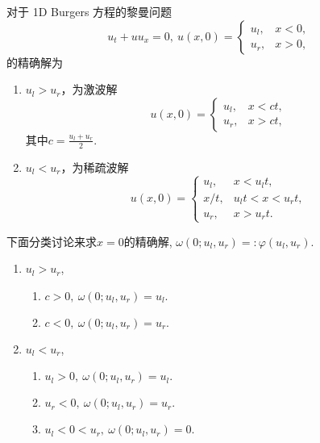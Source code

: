 \documentclass[12pt]{article}
\begin{document}
对于 1D Burgers 方程的黎曼问题
\begin{equation}
	u_{t}+uu_x=0,\ u\left(x, 0\right)=\left\{\begin{array}{ll}
		u_l, & x<0, \\
		u_r, & x>0,
	\end{array}\right.
\end{equation}
的精确解为
\begin{enumerate}
	\item $u_l>u_r$，为激波解
	      \begin{equation}
		      u\left(x, 0\right)=\left\{\begin{array}{ll}
			      u_l, & x<ct, \\
			      u_r, & x>ct,
		      \end{array}\right.
	      \end{equation}
	      其中$c=\frac{u_l+u_r}{2}$.
	\item $u_l<u_r$，为稀疏波解
	      \begin{equation}
		      u\left(x, 0\right)=\left\{\begin{array}{ll}
			      u_l, & x<u_lt,      \\
			      x/t, & u_lt<x<u_rt, \\
			      u_r, & x>u_rt.
		      \end{array}\right.
	      \end{equation}
\end{enumerate}

下面分类讨论来求$x=0$的精确解, $\omega\left(0;u_l,u_r\right)=:\varphi(u_l,u_r).$

\begin{enumerate}
	\item $u_l>u_r$,
	      \begin{enumerate}
		      \item $c>0,\ \omega\left(0;u_l,u_r\right)=u_l.$
		      \item $c<0,\ \omega\left(0;u_l,u_r\right)=u_r.$
	      \end{enumerate}
	\item $u_l<u_r$,
	      \begin{enumerate}
		      \item $u_l>0,\ \omega\left(0;u_l,u_r\right)=u_l.$
		      \item $u_r<0,\ \omega\left(0;u_l,u_r\right)=u_r.$
		      \item $u_l<0<u_r,\ \omega\left(0;u_l,u_r\right)=0.$
	      \end{enumerate}
\end{enumerate}
\end{document}
